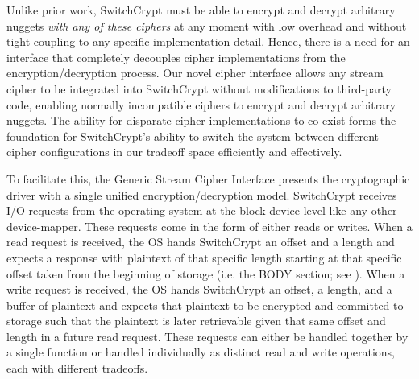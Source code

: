 Unlike prior work, SwitchCrypt must be able to encrypt and decrypt
arbitrary nuggets \emph{with any of these ciphers} at any moment with
low overhead and without tight coupling to any specific implementation
detail. Hence, there is a need for an interface that completely
decouples cipher implementations from the encryption/decryption
process.  Our novel cipher interface allows any stream
cipher to be integrated into SwitchCrypt without modifications to
third-party code, enabling normally incompatible ciphers to encrypt
and decrypt arbitrary nuggets. The ability for disparate cipher
implementations to co-exist forms the foundation for SwitchCrypt's
ability to switch the system between different cipher configurations
in our tradeoff space efficiently and effectively.  

To facilitate this, the Generic Stream Cipher Interface presents the
cryptographic driver with a single unified encryption/decryption model.
SwitchCrypt receives I/O requests from the operating system at the block device
level like any other device-mapper. These requests come in the form of either
reads or writes. When a read request is received, the OS hands SwitchCrypt an
offset and a length and expects a response with plaintext of that specific
length starting at that specific offset taken from the beginning of storage
(i.e. the BODY section; see ). When a write request is
received, the OS hands SwitchCrypt an offset, a length, and a buffer of
plaintext and expects that plaintext to be encrypted and committed to storage
such that the plaintext is later retrievable given that same offset and length
in a future read request. These requests can either be handled together by a
single function or handled individually as distinct read and write operations,
each with different tradeoffs.

